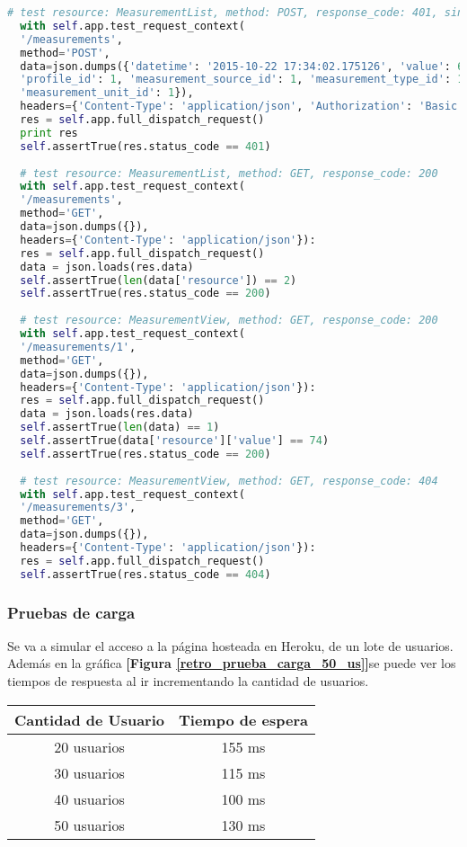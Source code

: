 \begin{lstlisting}[language=Python ]
  # test resource: MeasurementList, method: POST, response_code: 401, sin autorizacion, token invalido
  with self.app.test_request_context(
  '/measurements',
  method='POST',
  data=json.dumps({'datetime': '2015-10-22 17:34:02.175126', 'value': 68, 'analysis_id': 1,
  'profile_id': 1, 'measurement_source_id': 1, 'measurement_type_id': 1,
  'measurement_unit_id': 1}),
  headers={'Content-Type': 'application/json', 'Authorization': 'Basic ' + token_a}):
  res = self.app.full_dispatch_request()
  print res
  self.assertTrue(res.status_code == 401)
  
  # test resource: MeasurementList, method: GET, response_code: 200
  with self.app.test_request_context(
  '/measurements',
  method='GET',
  data=json.dumps({}),
  headers={'Content-Type': 'application/json'}):
  res = self.app.full_dispatch_request()
  data = json.loads(res.data)
  self.assertTrue(len(data['resource']) == 2)
  self.assertTrue(res.status_code == 200)
  
  # test resource: MeasurementView, method: GET, response_code: 200
  with self.app.test_request_context(
  '/measurements/1',
  method='GET',
  data=json.dumps({}),
  headers={'Content-Type': 'application/json'}):
  res = self.app.full_dispatch_request()
  data = json.loads(res.data)
  self.assertTrue(len(data) == 1)
  self.assertTrue(data['resource']['value'] == 74)
  self.assertTrue(res.status_code == 200)
  
  # test resource: MeasurementView, method: GET, response_code: 404
  with self.app.test_request_context(
  '/measurements/3',
  method='GET',
  data=json.dumps({}),
  headers={'Content-Type': 'application/json'}):
  res = self.app.full_dispatch_request()
  self.assertTrue(res.status_code == 404)
  \end{lstlisting}
  
  \subsubsection{Pruebas de carga}
  Se va a simular el acceso a la página hosteada en Heroku, de un lote de usuarios. Además en la gráfica \textbf{[Figura \ref{retro_prueba_carga_50_us}]}se puede ver los tiempos de respuesta al ir incrementando la cantidad de usuarios.
  
  \begin{center}
  	\begin{tabular}{|c|c|}
  		\hline Cantidad de Usuario  &  Tiempo de espera\\ 
  		\hline 20 usuarios &  155 ms \\ 
  		\hline 30 usuarios  & 115 ms \\ 
  		\hline 40 usuarios  & 100 ms \\ 
  		\hline 50 usuarios  & 130 ms \\ 	
  		\hline 
  	\end{tabular} 
  \end{center}
  
